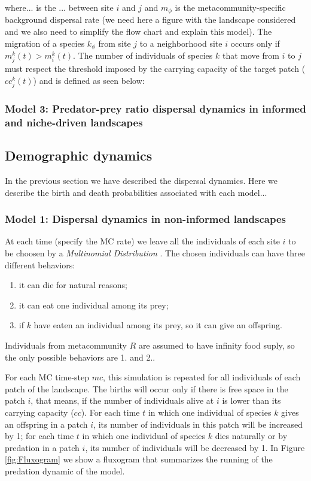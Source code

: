 where... is the ... between site $i$ and $j$ and $m_{\mathcal{\phi}}$
is the metacommunity-specific background dispersal rate (we need here
a figure with the landscape considered and we also need to simplify
the flow chart and explain this model). The migration of a species
$k_{\mathcal{\phi}}$ from site $j$ to a neighborhood site $i$ occurs
only if $m_{j}^k(t) > m_{i}^k(t)$. The number of individuals of
species $k$ that move from $i$ to $j$ must respect the threshold
imposed by the carrying capacity of the target patch ($cc_j^k(t)$) and
is defined as seen below:

\subsubsection{Model 3: Predator-prey ratio dispersal dynamics in informed and niche-driven landscapes}


\subsection{Demographic dynamics}

In the previous section we have described the dispersal dynamics. Here
we describe the birth and death probabilities associated with each model...

\subsubsection{Model 1: Dispersal dynamics in non-informed landscapes}

At each time (specify the MC rate) we leave all the individuals of
each site $i$ to be choosen by a \emph{Multinomial Distribution}
\cite{levin1981representation}. The chosen individuals can have
three different behaviors:
\begin{enumerate}
\item it can die for natural reasons;
\item it can eat one individual among its prey; 
\item if $k$ have eaten an individual among its prey, so it can give an offspring. 
\end{enumerate}

Individuals from metacommunity $R$ are assumed to have infinity food suply, so
the only possible behaviors are 1. and 2.. 

For each MC time-step $mc$, this simulation is repeated for all individuals of
each patch of the landscape. The births will occur only if there is free space
in the patch $i$, that means, if the number of individuals alive at $i$ is
lower than its carrying capacity ($cc$). For each time $t$ in which one
individual of species $k$ gives an offspring in a patch $i$, its number of
individuals in this patch will be increased by 1; for each time $t$ in which
one individual of species $k$ dies naturally or by predation in a patch $i$,
its number of individuals will be decreased by 1. In Figure \ref{fig:Fluxogram}
we show a fluxogram that summarizes the running of the predation dynamic of the
model.

